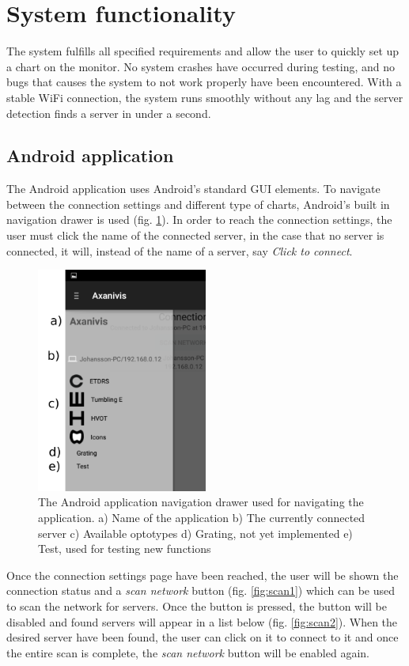 \documentclass[12pt,a4paper,notitlepage]{report}
\begin{document}
\section{System functionality} 
The system fulfills all specified requirements and allow the user to quickly set up a chart on the monitor. No system crashes have occurred during testing, and no bugs that causes the system to not work properly have been encountered. With a stable WiFi connection, the system runs smoothly without any lag and the server detection finds a server in under a second. 

\subsection{Android application}
The Android application uses Android's standard GUI elements. To navigate between the connection settings and different type of charts, Android's built in navigation drawer is used (fig. \ref{fig:app_nav_drawer}). In order to reach the connection settings, the user must click the name of the connected server, in the case that no server is connected, it will, instead of the name of a server, say \textit{Click to connect}.

\begin{figure}[ht!]
\centering
\includegraphics[width=56mm]{images/appgui/nav_drawer.png}
\caption{The Android application navigation drawer used for navigating the application. a) Name of the application b) The currently connected server c) Available optotypes d) Grating, not yet implemented e) Test, used for testing new functions}
\label{fig:app_nav_drawer}
\end{figure}

Once the connection settings page have been reached, the user will be shown the connection status and a \textit{scan network} button (fig. \ref{fig:scan1}) which can be used to scan the network for servers. Once the button is pressed, the button will be disabled and found servers will appear in a list below (fig. \ref{fig:scan2}). When the desired server have been found, the user can click on it to connect to it and once the entire scan is complete, the \textit{scan network} button will be enabled again.
\end{document}
